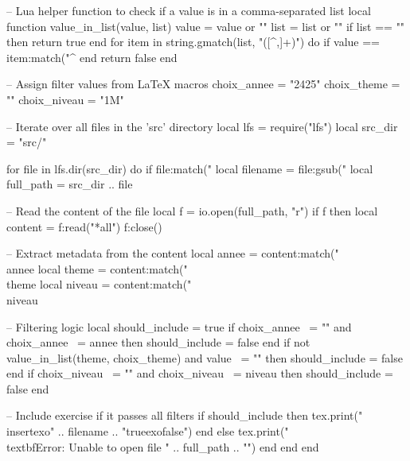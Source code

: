 \documentclass[a4paper,12pt]{report}
\def\choixAnnee{2425}
\def\choixTheme{}
\def\choixNiveau{1M}
\edef\luaChoixAnnee{\choixAnnee}
\edef\luaChoixTheme{\choixTheme}
\edef\luaChoixNiveau{\choixNiveau}
\begin{document}
\begin{luacode}

-- Lua helper function to check if a value is in a comma-separated list
local function value_in_list(value, list)
    value = value or ""
    list = list or ""
    if list == "" then return true end
    for item in string.gmatch(list, "([^,]+)") do
        if value == item:match("^%
    end
    return false
end

-- Assign filter values from LaTeX macros
choix_annee = "\luaChoixAnnee"
choix_theme = "\luaChoixTheme"
choix_niveau = "\luaChoixNiveau"

-- Iterate over all files in the 'src' directory
local lfs = require("lfs")
local src_dir = "src/"

for file in lfs.dir(src_dir) do
    if file:match("%
        local filename = file:gsub("%
        local full_path = src_dir .. file
        
        -- Read the content of the file
        local f = io.open(full_path, "r")
        if f then
            local content = f:read("*all")
            f:close()
            
            -- Extract metadata from the content
            local annee = content:match("\\annee%
            local theme = content:match("\\theme%
            local niveau = content:match("\\niveau%
            
            -- Filtering logic
            local should_include = true
            if choix_annee ~= "" and choix_annee ~= annee then
                should_include = false
            end
            if not value_in_list(theme, choix_theme) and value ~= "" then
                should_include = false
            end
            if choix_niveau ~= "" and choix_niveau ~= niveau then
                should_include = false
            end
            
            -- Include exercise if it passes all filters
            if should_include then
            	tex.print("\\insertexo{" .. filename .. "}{true}{exo}{false}")
            end
        else
            tex.print("\\textbf{Error: Unable to open file " .. full_path .. "}")
        end
    end
end

\end{luacode}
\end{document}
